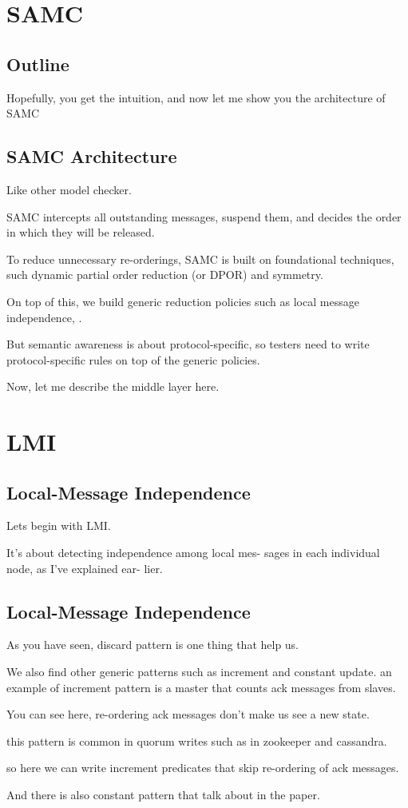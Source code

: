 
\section{SAMC}

\subsection{Outline}

Hopefully, you get the intuition, and now let me show you the architecture of
SAMC

\subsection{SAMC Architecture}

Like other model checker.

SAMC intercepts all outstanding messages, suspend them, and decides the order in
which they will be released.

To reduce unnecessary re-orderings, SAMC is built on foundational techniques,
such dynamic partial order reduction (or DPOR) and symmetry.

On top of this, we build generic reduction policies such as local message
independence, .

But semantic awareness is about protocol-specific, so testers need to write
protocol-specific rules on top of the generic policies.

Now, let me describe the middle layer here.

\section{LMI}

\subsection{Local-Message Independence}

Lets begin with LMI.

It’s about detecting independence among local mes- sages in each individual
node, as I’ve explained ear- lier.

\subsection{Local-Message Independence}

As you have seen, discard pattern is one thing that help us.

We also find other generic patterns such as increment and constant update.
an example of increment pattern is a master that counts ack messages from
slaves.

You can see here, re-ordering ack messages don’t make us see a new state.

this pattern is common in quorum writes such as in zookeeper and cassandra.

so here we can write increment predicates that skip re-ordering of ack messages.

And there is also constant pattern that talk about in the paper.

